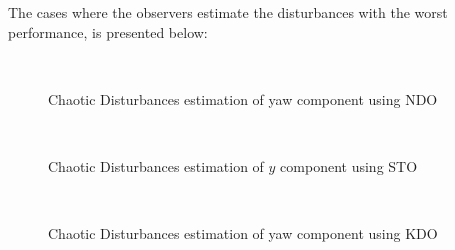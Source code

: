 \documentclass[letterpaper%
, twoside%
, 12pt%
,memoire%
, english%
,creativecommons,hyperref%
]{thETS}
\theoremstyle{newThmStyle}
\begin{document}
The cases where the observers estimate the disturbances with the worst performance, is presented below:

\begin{figure}[H]
\centering
{}
\\ \parbox{0.75\textwidth}{\caption{Chaotic Disturbances estimation of yaw component using NDO}\label{dis_m1_est_yaw_ndo}}
\end{figure}

\begin{figure}[H]
\centering
{}
\\ \parbox{0.75\textwidth}{\caption{Chaotic Disturbances estimation of $y$ component using STO}\label{dis_m1_est_y_sto}}
\end{figure}

\begin{figure}[H]
\centering
{}
\\ \parbox{0.75\textwidth}{\caption{Chaotic Disturbances estimation of yaw component using KDO}\label{dis_m1_est_yaw_kdo}}
\end{figure}
\end{document}
